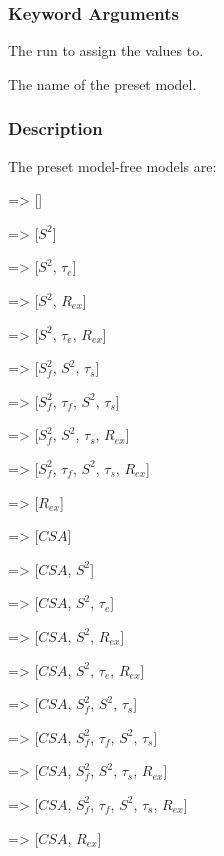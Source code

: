 \subsubsection{Keyword Arguments}


  The run to assign the values to.

  The name of the preset model.

\subsubsection{Description}

The preset model-free models are:
    
    => []
    
    => [$S^2$]
    
    => [$S^2$, $\tau_e$]
    
    => [$S^2$, $R_{ex}$]
    
    => [$S^2$, $\tau_e$, $R_{ex}$]
    
    => [$S^2_f$, $S^2$, $\tau_s$]
    
    => [$S^2_f$, $\tau_f$, $S^2$, $\tau_s$]
    
    => [$S^2_f$, $S^2$, $\tau_s$, $R_{ex}$]
    
    => [$S^2_f$, $\tau_f$, $S^2$, $\tau_s$, $R_{ex}$]
    
    => [$R_{ex}$]

    
   => [$CSA$]
    
   => [$CSA$, $S^2$]
    
   => [$CSA$, $S^2$, $\tau_e$]
    
   => [$CSA$, $S^2$, $R_{ex}$]
    
   => [$CSA$, $S^2$, $\tau_e$, $R_{ex}$]
    
   => [$CSA$, $S^2_f$, $S^2$, $\tau_s$]
    
   => [$CSA$, $S^2_f$, $\tau_f$, $S^2$, $\tau_s$]
    
   => [$CSA$, $S^2_f$, $S^2$, $\tau_s$, $R_{ex}$]
    
   => [$CSA$, $S^2_f$, $\tau_f$, $S^2$, $\tau_s$, $R_{ex}$]
    
   => [$CSA$, $R_{ex}$]

